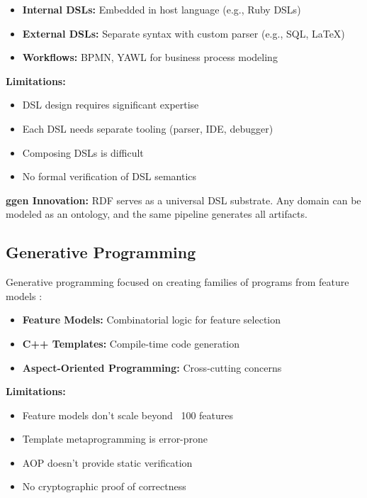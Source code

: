 \begin{itemize}
    \item \textbf{Internal DSLs:} Embedded in host language (e.g., Ruby DSLs)
    \item \textbf{External DSLs:} Separate syntax with custom parser (e.g., SQL, LaTeX)
    \item \textbf{Workflows:} BPMN, YAWL for business process modeling
\end{itemize}

\textbf{Limitations:}
\begin{itemize}
    \item DSL design requires significant expertise
    \item Each DSL needs separate tooling (parser, IDE, debugger)
    \item Composing DSLs is difficult
    \item No formal verification of DSL semantics
\end{itemize}

\textbf{ggen Innovation:} RDF serves as a universal DSL substrate. Any domain can be modeled as an ontology, and the same pipeline generates all artifacts.

\subsection{Generative Programming}

Generative programming focused on creating families of programs from feature models \cite{czarnecki2000generative}:

\begin{itemize}
    \item \textbf{Feature Models:} Combinatorial logic for feature selection
    \item \textbf{C++ Templates:} Compile-time code generation
    \item \textbf{Aspect-Oriented Programming:} Cross-cutting concerns
\end{itemize}

\textbf{Limitations:}
\begin{itemize}
    \item Feature models don't scale beyond ~100 features
    \item Template metaprogramming is error-prone
    \item AOP doesn't provide static verification
    \item No cryptographic proof of correctness
\end{itemize}

